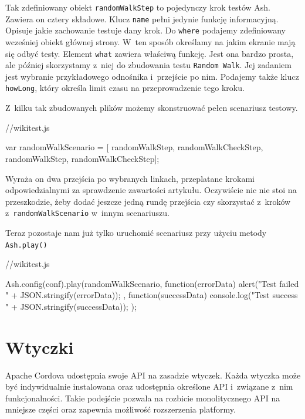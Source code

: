 \documentclass[brudnopis]{xmgr}
\begin{document}
Tak zdefiniowany obiekt \texttt{randomWalkStep} to pojedynczy krok testów Ash. Zawiera on cztery składowe. Klucz \texttt{name} pełni jedynie funkcję informacyjną. Opisuje jakie zachowanie testuje dany krok. Do \texttt{where} podajemy zdefiniowany wcześniej obiekt głównej strony. W~ten sposób określamy na jakim ekranie mają się odbyć testy. Element \texttt{what} zawiera właściwą funkcję. Jest ona bardzo prosta, ale później skorzystamy z~niej do zbudowania testu \texttt{Random Walk}. Jej zadaniem jest wybranie przykładowego odnośnika i~przejście po nim. Podajemy także klucz \texttt{howLong}, który określa limit czasu na przeprowadzenie tego kroku.

Z~kilku tak zbudowanych plików możemy skonstruować pełen scenariusz testowy.

\begin{javascriptcode}
   //wikitest.js

   var randomWalkScenario = [
        randomWalkStep,
        randomWalkCheckStep,
        randomWalkStep,
        randomWalkCheckStep];

\end{javascriptcode}

\noindent Wyraża on dwa przejścia po wybranych linkach, przeplatane krokami odpowiedzialnymi za sprawdzenie zawartości artykułu. Oczywiście nic nie stoi na przeszkodzie, żeby dodać jeszcze jedną rundę przejścia czy skorzystać z~kroków z~\texttt{randomWalkScenario} w~innym scenariuszu.

Teraz pozostaje nam już tylko uruchomić scenariusz przy użyciu metody \texttt{Ash.play()}

\begin{javascriptcode}
   //wikitest.js

   Ash.config(conf).play(randomWalkScenario, function(errorData){
        alert("Test failed " + JSON.stringify(errorData));
    }, function(successData){
        console.log("Test success " + JSON.stringify(successData));
    });

\end{javascriptcode}

\chapter{Wtyczki}

Apache Cordova udostępnia swoje API na zasadzie wtyczek. Każda wtyczka może być indywidualnie instalowana oraz udostępnia określone API i~związane z~nim funkcjonalności. Takie podejście pozwala na rozbicie monolitycznego API na mniejsze części oraz zapewnia możliwość rozszerzenia platformy.
\end{document}

